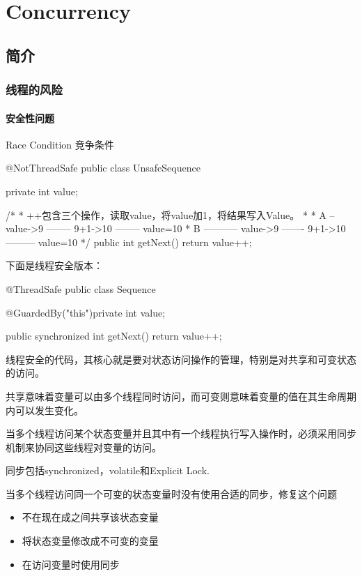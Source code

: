 \chapter{Concurrency}

\section{简介}
\subsection{线程的风险}

\subsubsection{安全性问题}
Race Condition 竞争条件

\begin{Java}
@NotThreadSafe
public class UnsafeSequence {

	private int value;

	/*
	 * ++包含三个操作，读取value，将value加1，将结果写入Value。
	 * 
	 * A   -- value->9 -------- 9+1->10 -------- value=10  
	 * B   ----------- value->9 ------- 9+1->10--------- value=10      
	 */
	public int getNext() {
		return value++;
	}
}
\end{Java}

下面是线程安全版本：
\begin{Java}
@ThreadSafe
public class Sequence {

	@GuardedBy("this")private int value;

	public synchronized int getNext() {
		return value++;
	}
}
\end{Java}

线程安全的代码，其核心就是要对状态访问操作的管理，特别是对共享和可变状态的访问。

共享意味着变量可以由多个线程同时访问，而可变则意味着变量的值在其生命周期内可以发生变化。

当多个线程访问某个状态变量并且其中有一个线程执行写入操作时，必须采用同步机制来协同这些线程对变量的访问。

同步包括synchronized，volatile和Explicit Lock.

当多个线程访问同一个可变的状态变量时没有使用合适的同步，修复这个问题
\begin{itemize}
\item 不在现在成之间共享该状态变量
\item 将状态变量修改成不可变的变量
\item 在访问变量时使用同步
\end{itemize}

